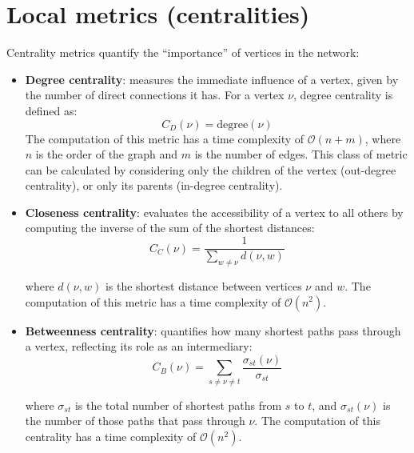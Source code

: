 \documentclass[12pt,a4paper]{report}
\begin{document}
\section{Local metrics (centralities)}
\label{sec:centralities}

Centrality metrics quantify the “importance” of vertices in the network:

\begin{itemize}
    \item \textbf{Degree centrality}: measures the immediate influence of a vertex, given by the number of direct connections it has. For a vertex \( \nu \), degree centrality is defined as:
\begin{equation}
 C_D(\nu) = \text{degree}(\nu)
\end{equation}    
The computation of this metric has a time complexity of \( \mathcal{O}(n + m) \), where $n$ is the order of the graph and $m$ is the number of edges. This class of metric can be calculated by considering only the children of the vertex (out-degree centrality), or only its parents (in-degree centrality).

    \item \textbf{Closeness centrality}: evaluates the accessibility of a vertex to all others by computing the inverse of the sum of the shortest distances:
\begin{equation}
 C_C(\nu) = \frac{1}{\sum_{w \neq \nu} d(\nu, w)}
\end{equation}

    where \( d(\nu, w) \) is the shortest distance between vertices \( \nu \) and \( w \). The computation of this metric has a time complexity of \( \mathcal{O}(n^2) \).

    \item \textbf{Betweenness centrality}: quantifies how many shortest paths pass through a vertex, reflecting its role as an intermediary:
\begin{equation}
C_B(\nu) = \sum_{s \neq \nu \neq t} \frac{\sigma_{st}(\nu)}{\sigma_{st}}
\end{equation}

    where \( \sigma_{st} \) is the total number of shortest paths from \( s \) to \( t \), and \( \sigma_{st}(\nu) \) is the number of those paths that pass through \( \nu \). The computation of this centrality has a time complexity of \( \mathcal{O}(n^2) \).


\end{itemize}
\end{document}
